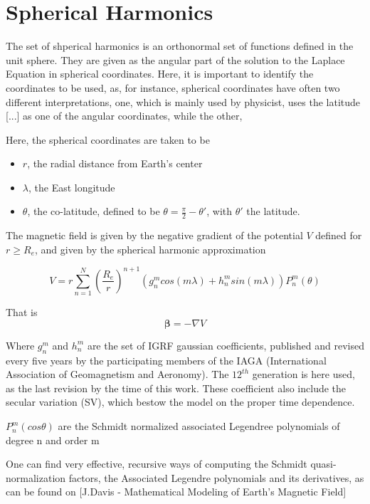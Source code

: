 
\section{Spherical Harmonics}

The set of shperical harmonics is an orthonormal set of functions defined in the unit sphere. They are given as the angular part of the solution to the Laplace Equation in spherical coordinates. Here, it is important to identify the coordinates to be used, as, for instance, spherical coordinates have often two different interpretations, one, which is mainly used by physicist, uses the latitude [...] as one of the angular coordinates, while the other, 

Here, the spherical coordinates are taken to be
\begin{itemize} 
\item[] $r$, the radial distance from Earth's center
\item[] $\lambda$, the East longitude %
\item[] $\theta$, the co-latitude, defined to be $\theta = \frac{\pi}{2} - \theta'$, with $\theta'$ the latitude. %
\end{itemize}


The magnetic field is given by the negative gradient of the potential $V$ defined for $r \geq R_e$, and given by the spherical harmonic approximation

\begin{equation}
V = r \sum_{n=1}^{N} \left(\dfrac{R_e}{r}\right)^{n+1} \left(g_n^m cos(m\lambda) + h_n^m sin(m\lambda)\right) P_n^m(\theta)
\end{equation}

That is
\begin{equation}
{\bm \beta} = -\nabla V
\end{equation}


Where $g_n^m$ and $h_n^m$ are the set of IGRF gaussian coefficients, published and revised every five years by the participating members of the IAGA (International Association
of Geomagnetism and Aeronomy). The $12^{th}$ generation is here used, as the last revision by the time of this work. These coefficient also include the secular variation (SV), which bestow the model on the proper time dependence.

$P_n^m(cos \theta)$ are the Schmidt normalized associated Legendree polynomials of degree n and order m

One can find very effective, recursive ways of computing the Schmidt quasi-normalization factors, the Associated Legendre polynomials and its derivatives, as can be found on [J.Davis - Mathematical Modeling of Earth’s Magnetic Field] %